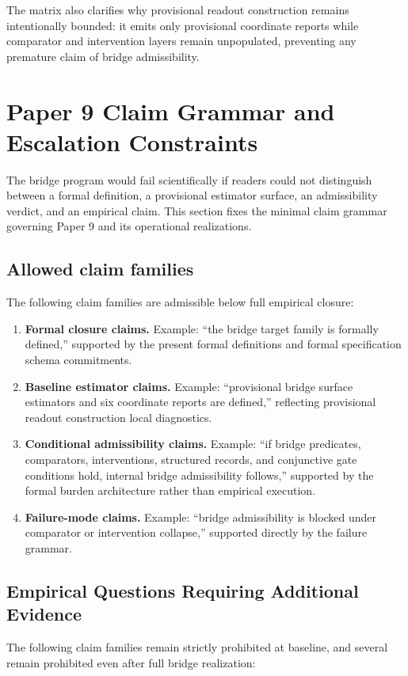 \documentclass[11pt,a4paper]{article}
\theoremstyle{definition}
\begin{document}
The matrix also clarifies why provisional readout construction remains intentionally bounded: it emits only provisional coordinate reports while comparator and intervention layers remain unpopulated, preventing any premature claim of bridge admissibility.

\section{Paper 9 Claim Grammar and Escalation Constraints}
The bridge program would fail scientifically if readers could not distinguish between a formal definition, a provisional estimator surface, an admissibility verdict, and an empirical claim. This section fixes the minimal claim grammar governing Paper 9 and its operational realizations.

\subsection{Allowed claim families}
The following claim families are admissible below full empirical closure:

\begin{enumerate}[leftmargin=1.5em]
\item \textbf{Formal closure claims.} Example: ``the bridge target family is formally defined,'' supported by the present formal definitions and formal specification schema commitments.
\item \textbf{Baseline estimator claims.} Example: ``provisional bridge surface estimators and six coordinate reports are defined,'' reflecting provisional readout construction local diagnostics.
\item \textbf{Conditional admissibility claims.} Example: ``if bridge predicates, comparators, interventions, structured records, and conjunctive gate conditions hold, internal bridge admissibility follows,'' supported by the formal burden architecture rather than empirical execution.
\item \textbf{Failure-mode claims.} Example: ``bridge admissibility is blocked under comparator or intervention collapse,'' supported directly by the failure grammar.
\end{enumerate}

\subsection{Empirical Questions Requiring Additional Evidence}
The following claim families remain strictly prohibited at baseline, and several remain prohibited even after full bridge realization:
\end{document}

